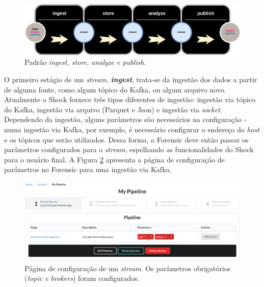 \begin{figure}
  \centering
  \includegraphics[width=\textwidth]{figuras/arquiteturaforensic.png}
  \caption{Padrão \textit{ingest, store, analyze e publish.}}
  \label{fig:ingeststore}
\end{figure}

O primeiro estágio de um \textit{stream}, \textit{\textbf{ingest}}, trata-se da
ingestão dos dados a partir de alguma fonte, como algum tópico do Kafka, ou
algum arquivo novo. Atualmente o Shock fornece três tipos diferentes de
ingestão: ingestão via tópico do
Kafka, ingestão via arquivo (Parquet e Json) e ingestão via \textit{socket}.
Dependendo da ingestão, alguns parâmetros são necessários na configuração -
numa ingestão via Kafka, por exemplo, é necessário configurar o endereço do
\textit{host} e os tópicos que serão utilizados. Dessa forma, o Forensic deve
então passar os parâmetros configurados para o \textit{stream}, espelhando as
funcionalidades do Shock para o usuário final. A Figura \ref{fig:forensicparams}
apresenta a página de configuração de parâmetros no Forensic para uma ingestão
via Kafka.



\begin{figure}
  \centering
  \includegraphics[width=\textwidth]{figuras/pipeline.png}
    \caption{Página de configuração de um \textit{stream}. Os parâmetros
obrigatórios (\textit{topic e brokers}) foram configurados.}
  \label{fig:forensicparams}
\end{figure}

